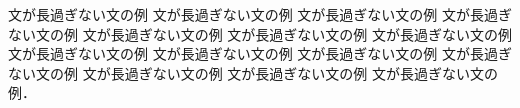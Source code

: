文が長過ぎない文の例
文が長過ぎない文の例
文が長過ぎない文の例
文が長過ぎない文の例
文が長過ぎない文の例
文が長過ぎない文の例
文が長過ぎない文の例
文が長過ぎない文の例
文が長過ぎない文の例
文が長過ぎない文の例
文が長過ぎない文の例
文が長過ぎない文の例
文が長過ぎない文の例
文が長過ぎない文の例．
